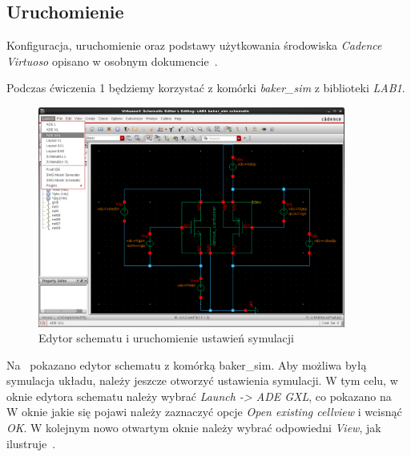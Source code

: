 \documentclass[twoside,pl,final]{labman}
\begin{document}
\subsection{Uruchomienie}
\label{measure:virtuoso:run}

Konfiguracja, uruchomienie oraz podstawy użytkowania środowiska
\emph{Cadence Virtuoso} opisano w osobnym dokumencie~\cite{adec:cds:man}.

Podczas ćwiczenia 1 będziemy korzystać z komórki \emph{baker\_sim}
z biblioteki \emph{LAB1}.

\begin{figure}[!htbp]
  \centering
  \includegraphics[width=0.9\textwidth]{baker_sch}
  \caption{Edytor schematu i uruchomienie ustawień symulacji}
  \label{fig:measure:baker_sch}
\end{figure}

Na~ pokazano edytor schematu z komórką baker\_sim.
Aby możliwa byłą symulacja układu,
należy jeszcze otworzyć ustawienia symulacji.
W tym celu, w oknie edytora schematu należy wybrać \emph{Launch -> ADE GXL},
co pokazano na~
W oknie jakie się pojawi należy zaznaczyć opcje \emph{Open existing cellview}
i wcisnąć \emph{OK}.
W kolejnym nowo otwartym oknie należy wybrać odpowiedni \emph{View},
jak ilustruje~.
\end{document}
